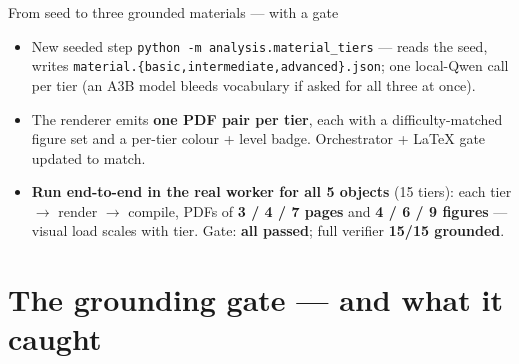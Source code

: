 \documentclass[aspectratio=169,10pt]{beamer}
\begin{document}
\begin{frame}{From seed to three grounded materials --- with a gate}
\scriptsize
\begin{center}
\end{center}
\vspace{0.2em}
\begin{itemize}\setlength\itemsep{2pt}
  \item New seeded step \texttt{python -m analysis.material\_tiers} --- reads the seed, writes
  \texttt{material.\{basic,intermediate,advanced\}.json}; one local-Qwen call per tier (an A3B
  model bleeds vocabulary if asked for all three at once).
  \item The renderer emits \textbf{one PDF pair per tier}, each with a difficulty-matched figure
  set and a per-tier colour + level badge. Orchestrator + LaTeX gate updated to match.
  \item \textbf{Run end-to-end in the real worker for all 5 objects} (15 tiers): each tier $\rightarrow$
  render $\rightarrow$ compile, PDFs of \textbf{3 / 4 / 7 pages} and \textbf{4 / 6 / 9 figures} --- visual
  load scales with tier. Gate: \textbf{all passed}; full verifier \textbf{15/15 grounded}.
\end{itemize}
\end{frame}

\section{The grounding gate --- and what it caught}
\end{document}
